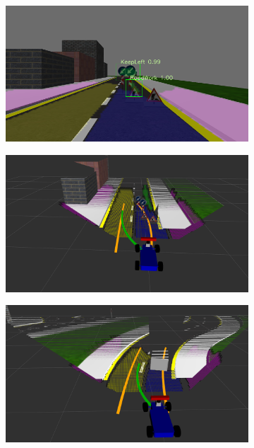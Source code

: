 \begin{figure}[h]
  \centering
  \begin{subfigure}[b]{0.45\linewidth}
    \includegraphics[width=\linewidth]{figures/experiments/construction-zone-img.png}
  \end{subfigure}
  \begin{subfigure}[b]{0.45\linewidth}
    \includegraphics[width=\linewidth]{figures/experiments/construction-zone-pc.png}
  \end{subfigure}
  \begin{subfigure}[b]{0.45\linewidth}
    \includegraphics[width=\linewidth]{figures/experiments/overtaking1-pc.png}

\end{subfigure}
\end{figure}
